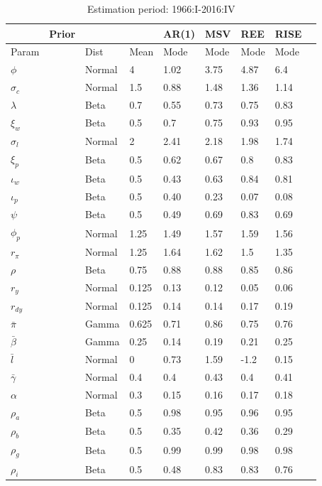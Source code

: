\documentclass[12pt,reqno]{article}
\numberwithin{equation}{section}
\begin{document}
\begin{table}[H]
\caption{Estimation period: 1966:I-2016:IV}
\begin{tabular}{llll|ll|lll}
 & Prior &  &  & AR(1) & MSV & REE & RISE &  \\
 \hline
 \hline
Param &  & Dist & Mean & Mode & Mode & Mode & Mode &  \\
\hline
\hline
$\phi$ &  & Normal & 4        		& 1.02 & 3.75 & 4.87 & 6.4 \\
$\sigma_c$ &  & Normal & 1.5		& 0.88 & 1.48 & 1.36 & 1.14 \\
$\lambda$ &  & Beta & 0.7 			& 0.55 & 0.73 & 0.75 & 0.83 \\
$\xi_w$ &  & Beta & 0.5 			& 0.7 & 0.75 & 0.93 & 0.95 \\
$\sigma_l$ &  & Normal & 2 			& 2.41 & 2.18 & 1.98 & 1.74 \\
$\xi_p$ &  & Beta & 0.5 			& 0.62 & 0.67 & 0.8 & 0.83 \\
$\iota_w$ &  & Beta & 0.5 			& 0.43 & 0.63 & 0.84 & 0.81 \\
$\iota_p$ &  & Beta & 0.5 			& 0.40 & 0.23 & 0.07 & 0.08 \\
$\psi$ &  & Beta & 0.5 				& 0.49 & 0.69 & 0.83 & 0.69 \\
$\phi_p$ &  & Normal & 1.25 		& 1.49 & 1.57 & 1.59 & 1.56 \\
$r_{\pi}$ &  & Normal & 1.25 		& 1.64 & 1.62 & 1.5 & 1.35 \\
$\rho$ &  & Beta & 0.75 			& 0.88 & 0.88 & 0.85 & 0.86 \\
$r_y$ &  & Normal & 0.125 			& 0.13 & 0.12 & 0.05 & 0.06 \\
$r_{dy}$ &  & Normal & 0.125 		& 0.14 & 0.14 & 0.17 & 0.19 \\
$\bar{\pi}$ &  & Gamma & 0.625 		& 0.71 & 0.86 & 0.75 & 0.76 \\
$\bar{\beta}$ &  & Gamma & 0.25 	& 0.14 & 0.19 & 0.21 & 0.25 \\
$\bar{l}$ &  & Normal & 0 			& 0.73 & 1.59 & -1.2 & 0.15 \\
$\bar{\gamma}$ &  & Normal & 0.4 	& 0.4 & 0.43 & 0.4 & 0.41 \\
$\alpha$ &  & Normal & 0.3 			& 0.15 & 0.16 & 0.17 & 0.18 \\
$\rho_a$ &  & Beta & 0.5 			& 0.98 & 0.95 & 0.96 & 0.95 \\
$\rho_b$ &  & Beta & 0.5 			& 0.35 & 0.42 & 0.36 & 0.29 \\
$\rho_g$ &  & Beta & 0.5 			& 0.99 & 0.99 & 0.98 & 0.98 \\
$\rho_i$ &  & Beta & 0.5 			& 0.48 & 0.83 & 0.83 & 0.76 \\

\end{tabular}
\end{table}
\end{document}
